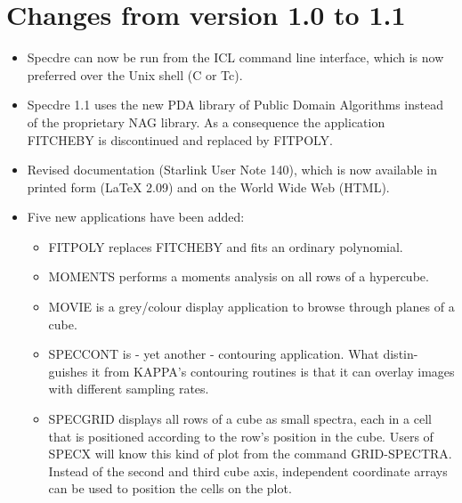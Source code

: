 \normalsize


\newpage
\section{\label{changes}Changes from version 1.0 to 1.1}

\begin{itemize}
\item Specdre can now be run from the ICL command line interface, which is now
    preferred over the Unix shell (C or Tc).

\item Specdre 1.1 uses the new PDA library of Public Domain Algorithms instead
    of  the proprietary  NAG  library.   As  a  consequence the  application
    FITCHEBY is discontinued and replaced by FITPOLY.

\item Revised  documentation (Starlink User Note 140),  which is now available
    in printed form (LaTeX 2.09) and on the World Wide Web (HTML).

\item Five new applications have been added:

   \begin{itemize}
   \item FITPOLY replaces FITCHEBY and fits an ordinary polynomial.

   \item MOMENTS performs a moments analysis on all rows of a hypercube.

   \item MOVIE is a  grey/colour display  application to browse through planes
       of a cube.

   \item SPECCONT  is  - yet  another -  contouring application. What distin-
       guishes it from  KAPPA's contouring routines is  that it can  overlay
       images with different sampling rates.

   \item SPECGRID displays all rows of a cube as small spectra, each in a cell
       that is positioned according to the row's position in the cube. Users
       of SPECX will know this  kind of plot  from the command GRID-SPECTRA.
       Instead of  the second and   third cube axis,  independent coordinate
       arrays can be used to position the cells on the plot.
   \end{itemize}


\end{itemize}
